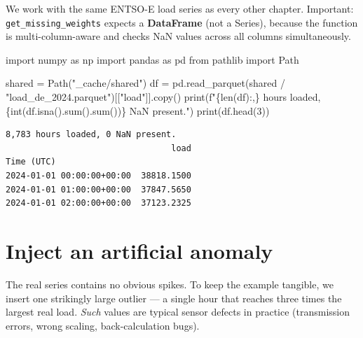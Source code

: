 \documentclass[
  english,
  letterpaper,
]{scrbook}
\newenvironment{Shaded}{\begin{snugshade}}{\end{snugshade}}
\newcommand{\BuiltInTok}[1]{\textcolor[rgb]{0.00,0.23,0.31}{#1}}
\newcommand{\DecValTok}[1]{\textcolor[rgb]{0.68,0.00,0.00}{#1}}
\newcommand{\ImportTok}[1]{\textcolor[rgb]{0.00,0.46,0.62}{#1}}
\newcommand{\NormalTok}[1]{\textcolor[rgb]{0.00,0.23,0.31}{#1}}
\newcommand{\OperatorTok}[1]{\textcolor[rgb]{0.37,0.37,0.37}{#1}}
\newcommand{\SpecialCharTok}[1]{\textcolor[rgb]{0.37,0.37,0.37}{#1}}
\newcommand{\SpecialStringTok}[1]{\textcolor[rgb]{0.13,0.47,0.30}{#1}}
\newcommand{\StringTok}[1]{\textcolor[rgb]{0.13,0.47,0.30}{#1}}
\begin{document}
We work with the same ENTSO-E load series as every other chapter.
Important: \texttt{get\_missing\_weights} expects a \textbf{DataFrame}
(not a Series), because the function is multi-column-aware and checks
NaN values across all columns simultaneously.

\protect{}\label{load-df}
\begin{Shaded}
\begin{Highlighting}[]
\ImportTok{import}\NormalTok{ numpy }\ImportTok{as}\NormalTok{ np}
\ImportTok{import}\NormalTok{ pandas }\ImportTok{as}\NormalTok{ pd}
\ImportTok{from}\NormalTok{ pathlib }\ImportTok{import}\NormalTok{ Path}

\NormalTok{shared }\OperatorTok{=}\NormalTok{ Path(}\StringTok{"\_cache/shared"}\NormalTok{)}
\NormalTok{df }\OperatorTok{=}\NormalTok{ pd.read\_parquet(shared }\OperatorTok{/} \StringTok{"load\_de\_2024.parquet"}\NormalTok{)[[}\StringTok{"load"}\NormalTok{]].copy()}
\BuiltInTok{print}\NormalTok{(}\SpecialStringTok{f"}\SpecialCharTok{\{}\BuiltInTok{len}\NormalTok{(df)}\SpecialCharTok{:,\}}\SpecialStringTok{ hours loaded, }\SpecialCharTok{\{}\BuiltInTok{int}\NormalTok{(df.isna().}\BuiltInTok{sum}\NormalTok{().}\BuiltInTok{sum}\NormalTok{())}\SpecialCharTok{\}}\SpecialStringTok{ NaN present."}\NormalTok{)}
\BuiltInTok{print}\NormalTok{(df.head(}\DecValTok{3}\NormalTok{))}
\end{Highlighting}
\end{Shaded}

\begin{verbatim}
8,783 hours loaded, 0 NaN present.
                                 load
Time (UTC)                           
2024-01-01 00:00:00+00:00  38818.1500
2024-01-01 01:00:00+00:00  37847.5650
2024-01-01 02:00:00+00:00  37123.2325
\end{verbatim}

\section{Inject an artificial
anomaly}\label{inject-an-artificial-anomaly}

The real series contains no obvious spikes. To keep the example
tangible, we insert one strikingly large outlier --- a single hour that
reaches three times the largest real load. \emph{Such} values are
typical sensor defects in practice (transmission errors, wrong scaling,
back-calculation bugs).
\end{document}

